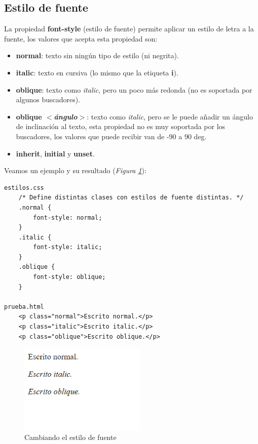 \subsection{Estilo de fuente}

La propiedad \textbf{font-style} (estilo de fuente) permite aplicar un estilo de letra a la fuente, los valores que acepta esta propiedad son:
\begin{itemize}
    \item \textbf{normal}: texto sin ningún tipo de estilo (ni negrita).
    \item \textbf{italic}: texto en cursiva (lo mismo que la etiqueta \textbf{i}).
    \item \textbf{oblique}: texto como \textit{italic}, pero un poco más redonda (no es soportada por algunos buscadores).
    \item \textbf{oblique \textit{$<$ángulo$>$}}: texto como \textit{italic}, pero se le puede añadir un ángulo de inclinación al texto, esta propiedad no es muy soportada por los buscadores, los valores que puede recibir van de -90 a 90 deg.
    \item \textbf{inherit}, \textbf{initial} y \textbf{unset}.
\end{itemize}

Veamos un ejemplo y su resultado (\textit{Figura \ref{fig: 5}}):
\begin{lstlisting}
estilos.css
    /* Define distintas clases con estilos de fuente distintas. */
    .normal {
        font-style: normal;
    }
    .italic {
        font-style: italic;
    }
    .oblique {
        font-style: oblique;
    }

prueba.html
    <p class="normal">Escrito normal.</p>
    <p class="italic">Escrito italic.</p>
    <p class="oblique">Escrito oblique.</p>
\end{lstlisting}
\begin{figure}[H]
    \centering
    \caption{Cambiando el estilo de fuente}
    \label{fig: 5}
    \includegraphics[width=6cm]{ss/fuentes-style.png}
\end{figure}

